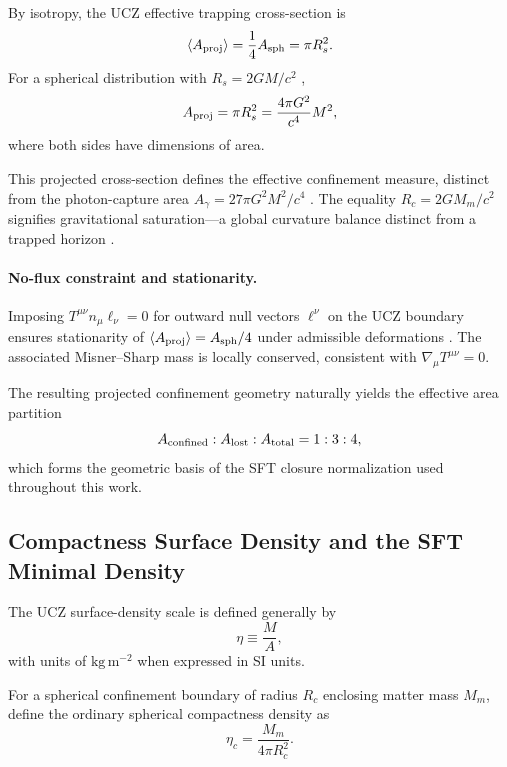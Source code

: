 \documentclass[12pt]{article}
\begin{document}
By isotropy, the UCZ effective trapping cross-section is
\[
\langle A_{\rm proj}\rangle = \frac{1}{4}A_{\rm sph} = \pi R_s^2.
\]
For a spherical distribution with \(R_s = 2GM/c^2\)
\cite{Schwarzschild1916,Carroll2004},
\begin{equation}
A_{\rm proj} = \pi R_s^2 = \frac{4\pi G^2}{c^4}M^2,
\label{eq:Aproj}
\end{equation}
where both sides have dimensions of area.

This projected cross-section defines the effective confinement measure, distinct from the
photon-capture area \(A_\gamma = 27\pi G^2M^2/c^4\)
\cite{Bekenstein1973,Hawking1973}.
The equality \(R_c = 2GM_m/c^2\) signifies gravitational saturation—a
global curvature balance distinct from a trapped horizon
\cite{Padmanabhan2003,Ellis2007}.

\paragraph{No-flux constraint and stationarity.}
Imposing \(T^{\mu\nu}n_\mu \ell_\nu = 0\)
for outward null vectors \(\ell^\nu\) on the UCZ boundary
ensures stationarity of \(\langle A_{\rm proj}\rangle = A_{\rm sph}/4\)
under admissible deformations \cite{Ellis2007,Padmanabhan2003}.
The associated Misner–Sharp mass is locally conserved, consistent with
\(\nabla_\mu T^{\mu\nu} = 0.\)

The resulting projected confinement geometry naturally yields the
effective area partition
\[
A_{\rm confined} : A_{\rm lost} : A_{\rm total} = 1 : 3 : 4,
\]
which forms the geometric basis of the SFT closure normalization used
throughout this work.

\subsection{Compactness Surface Density and the SFT Minimal Density}
\label{subsec:eta_min_eta_c}

The UCZ surface-density scale is defined generally by
\begin{equation}
\eta \equiv \frac{M}{A},
\end{equation}
with units of $\mathrm{kg\,m^{-2}}$ when expressed in SI units.

For a spherical confinement boundary of radius $R_c$ enclosing matter
mass $M_m$, define the ordinary spherical compactness density as
\begin{equation}
\eta_c
=
\frac{M_m}{4\pi R_c^2}.
\label{eq:eta_c_def}
\end{equation}
\end{document}
